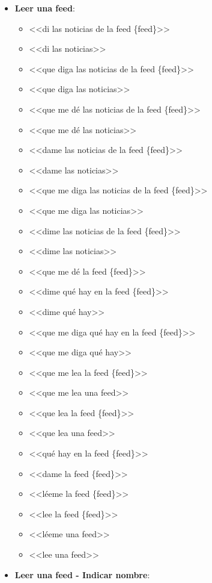 \documentclass[11pt,spanish,listoffigures,listoftables,table,hyphens,dvipsnames]{tfgetsinf}
\begin{document}
\begin{itemize}
   \item \textbf{Leer una feed}:
   \begin{itemize}
      \item <<di las noticias de la feed \{feed\}>>
      \item <<di las noticias>>
      \item <<que diga las noticias de la feed \{feed\}>>
      \item <<que diga las noticias>>
      \item <<que me dé las noticias de la feed \{feed\}>>
      \item <<que me dé las noticias>>
      \item <<dame las noticias de la feed \{feed\}>>
      \item <<dame las noticias>>
      \item <<que me diga las noticias de la feed \{feed\}>>
      \item <<que me diga las noticias>>
      \item <<dime las noticias de la feed \{feed\}>>
      \item <<dime las noticias>>
      \item <<que me dé la feed \{feed\}>>
      \item <<dime qué hay en la feed \{feed\}>>
      \item <<dime qué hay>>
      \item <<que me diga qué hay en la feed \{feed\}>>
      \item <<que me diga qué hay>>
      \item <<que me lea la feed \{feed\}>>
      \item <<que me lea una feed>>
      \item <<que lea la feed \{feed\}>>
      \item <<que lea una feed>>
      \item <<qué hay en la feed \{feed\}>>
      \item <<dame la feed \{feed\}>>
      \item <<léeme la feed \{feed\}>>
      \item <<lee la feed \{feed\}>>
      \item <<léeme una feed>>
      \item <<lee una feed>>
   \end{itemize}
   \item \textbf{Leer una feed - Indicar nombre}:
   \begin{itemize}

\end{itemize}
\end{itemize}
\end{document}
